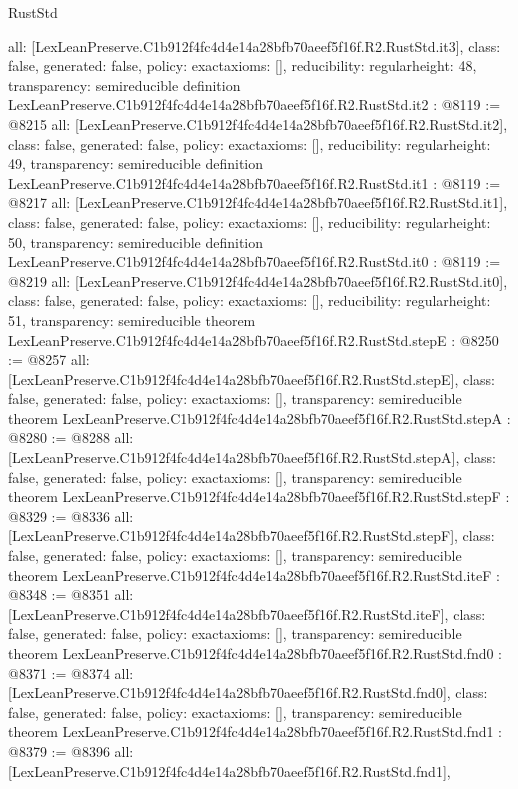 \begin{lexlean}{RustStd}
\begin{coremodule}
{  all: [LexLeanPreserve.C1b912f4fc4d4e14a28bfb70aeef5f16f.R2.RustStd.it3],
  class: false,
  generated: false,
  policy: exact{axioms: []},
  reducibility: regular{height: 48},
  transparency: semireducible
}
definition LexLeanPreserve.C1b912f4fc4d4e14a28bfb70aeef5f16f.R2.RustStd.it2 : @8119 := @8215 {
  all: [LexLeanPreserve.C1b912f4fc4d4e14a28bfb70aeef5f16f.R2.RustStd.it2],
  class: false,
  generated: false,
  policy: exact{axioms: []},
  reducibility: regular{height: 49},
  transparency: semireducible
}
definition LexLeanPreserve.C1b912f4fc4d4e14a28bfb70aeef5f16f.R2.RustStd.it1 : @8119 := @8217 {
  all: [LexLeanPreserve.C1b912f4fc4d4e14a28bfb70aeef5f16f.R2.RustStd.it1],
  class: false,
  generated: false,
  policy: exact{axioms: []},
  reducibility: regular{height: 50},
  transparency: semireducible
}
definition LexLeanPreserve.C1b912f4fc4d4e14a28bfb70aeef5f16f.R2.RustStd.it0 : @8119 := @8219 {
  all: [LexLeanPreserve.C1b912f4fc4d4e14a28bfb70aeef5f16f.R2.RustStd.it0],
  class: false,
  generated: false,
  policy: exact{axioms: []},
  reducibility: regular{height: 51},
  transparency: semireducible
}
theorem LexLeanPreserve.C1b912f4fc4d4e14a28bfb70aeef5f16f.R2.RustStd.stepE : @8250 := @8257 {
  all: [LexLeanPreserve.C1b912f4fc4d4e14a28bfb70aeef5f16f.R2.RustStd.stepE],
  class: false,
  generated: false,
  policy: exact{axioms: []},
  transparency: semireducible
}
theorem LexLeanPreserve.C1b912f4fc4d4e14a28bfb70aeef5f16f.R2.RustStd.stepA : @8280 := @8288 {
  all: [LexLeanPreserve.C1b912f4fc4d4e14a28bfb70aeef5f16f.R2.RustStd.stepA],
  class: false,
  generated: false,
  policy: exact{axioms: []},
  transparency: semireducible
}
theorem LexLeanPreserve.C1b912f4fc4d4e14a28bfb70aeef5f16f.R2.RustStd.stepF : @8329 := @8336 {
  all: [LexLeanPreserve.C1b912f4fc4d4e14a28bfb70aeef5f16f.R2.RustStd.stepF],
  class: false,
  generated: false,
  policy: exact{axioms: []},
  transparency: semireducible
}
theorem LexLeanPreserve.C1b912f4fc4d4e14a28bfb70aeef5f16f.R2.RustStd.iteF : @8348 := @8351 {
  all: [LexLeanPreserve.C1b912f4fc4d4e14a28bfb70aeef5f16f.R2.RustStd.iteF],
  class: false,
  generated: false,
  policy: exact{axioms: []},
  transparency: semireducible
}
theorem LexLeanPreserve.C1b912f4fc4d4e14a28bfb70aeef5f16f.R2.RustStd.fnd0 : @8371 := @8374 {
  all: [LexLeanPreserve.C1b912f4fc4d4e14a28bfb70aeef5f16f.R2.RustStd.fnd0],
  class: false,
  generated: false,
  policy: exact{axioms: []},
  transparency: semireducible
}
theorem LexLeanPreserve.C1b912f4fc4d4e14a28bfb70aeef5f16f.R2.RustStd.fnd1 : @8379 := @8396 {
  all: [LexLeanPreserve.C1b912f4fc4d4e14a28bfb70aeef5f16f.R2.RustStd.fnd1],
}
\end{coremodule}
\end{lexlean}

